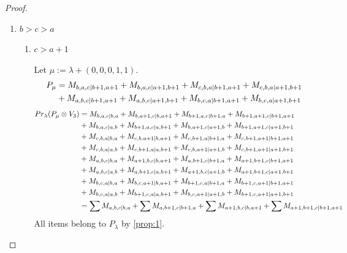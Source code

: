 \begin{proof}
\begin{enumerate}
    \item $b>c>a$
      \begin{enumerate}
        \item $c>a+1$ \par
        Let $\mu:=\lambda + (0,0,0,1,1) $.
        \begin{equation}\notag
          \begin{aligned}
            P_\mu &= M_{b,a,c|b+1,a+1}
+ M_{b,a,c|a+1,b+1}
+ M_{c,b,a|b+1,a+1}
+ M_{c,b,a|a+1,b+1}\\
                                              &
+ M_{a,b,c|b+1,a+1}
+ M_{a,b,c|a+1,b+1}
+ M_{b,c,a|b+1,a+1}
+ M_{b,c,a|a+1,b+1}
          \end{aligned}
        \end{equation}
        \begin{equation}\notag
          \begin{aligned}
            Pr_{\lambda}(P_\mu \otimes V_{3}) &=
M_{b,a,c|b,a}
+ M_{b,a+1,c|b,a+1}
+ M_{b+1,a,c|b+1,a}
+ M_{b+1,a+1,c|b+1,a+1}\\
                                              &
+ M_{b,a,c|a,b}
+ M_{b+1,a,c|a,b+1}
+ M_{b,a+1,c|a+1,b}
+ M_{b+1,a+1,c|a+1,b+1}\\
                                              &
+ M_{c,b,a|b,a}
+ M_{c,b,a+1|b,a+1}
+ M_{c,b+1,a|b+1,a}
+ M_{c,b+1,a+1|b+1,a+1}\\
                                              &
+ M_{c,b,a|a,b}
+ M_{c,b+1,a|a,b+1}
+ M_{c,b,a+1|a+1,b}
+ M_{c,b+1,a+1|a+1,b+1}\\
                                              &
+ M_{a,b,c|b,a}
+ M_{a+1,b,c|b,a+1}
+ M_{a,b+1,c|b+1,a}
+ M_{a+1,b+1,c|b+1,a+1}\\
                                              &
+ M_{a,b,c|a,b}
+ M_{a,b+1,c|a,b+1}
+ M_{a+1,b,c|a+1,b}
+ M_{a+1,b+1,c|a+1,b+1}\\
                                              &
+ M_{b,c,a|b,a}
+ M_{b,c,a+1|b,a+1}
+ M_{b+1,c,a|b+1,a}
+ M_{b+1,c,a+1|b+1,a+1}\\
                                              &
+ M_{b,c,a|a,b}
+ M_{b+1,c,a|a,b+1}
+ M_{b,c,a+1|a+1,b}
+ M_{b+1,c,a+1|a+1,b+1} \\
                                               &=
\sum M_{a,b,c|b,a}
+ \sum M_{a,b+1,c|b+1,a}
+ \sum M_{a+1,b,c|b,a+1}
+ \sum M_{a+1,b+1,c|b+1,a+1}
          \end{aligned}
        \end{equation}
All items belong to $P_\lambda$ by \cref{prop:1}.


\end{enumerate}
\end{enumerate}
\end{proof}
